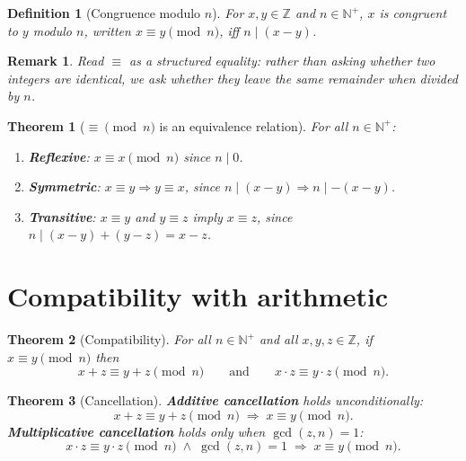 \documentclass[11pt]{article}
\theoremstyle{defstyle}
\newtheorem{definition}{Definition}[section]
\theoremstyle{thmstyle}
\newtheorem{theorem}{Theorem}[section]
\theoremstyle{notstyle}
\newtheorem*{remark}{Remark}
\theoremstyle{cautionstyle}
\newcommand{\Z}{\mathbb{Z}}
\newcommand{\Np}{\mathbb{N}^{+}}
\newcommand{\modn}{\pmod{n}}
\begin{document}
\begin{defbox}
\begin{definition}[Congruence modulo $n$]
For $x, y \in \Z$ and $n \in \Np$, $x$ is \emph{congruent to $y$ modulo
$n$}, written $x \equiv y \modn$, iff $n \mid (x-y)$.
\end{definition}
\end{defbox}

\begin{notebox}
\begin{remark}
Read $\equiv$ as a structured equality: rather than asking whether two
integers are identical, we ask whether they leave the same remainder when
divided by $n$.
\end{remark}
\end{notebox}

\begin{thmbox}
\begin{theorem}[$\equiv \modn$ is an equivalence relation]
For all $n \in \Np$:
\begin{enumerate}[label=\textnormal{(\roman*)}, leftmargin=2em, itemsep=2pt]
  \item \textbf{Reflexive}: $x \equiv x \modn$ since $n \mid 0$.
  \item \textbf{Symmetric}: $x \equiv y \Rightarrow y \equiv x$, since
        $n \mid (x-y) \Rightarrow n \mid -(x-y)$.
  \item \textbf{Transitive}: $x \equiv y$ and $y \equiv z$ imply
        $x \equiv z$, since $n \mid (x-y) + (y-z) = x-z$.
\end{enumerate}
\end{theorem}
\end{thmbox}

\section{Compatibility with arithmetic}

\begin{thmbox}
\begin{theorem}[Compatibility]
For all $n \in \Np$ and all $x, y, z \in \Z$, if $x \equiv y \modn$ then
\[
  x + z \equiv y + z \modn
  \qquad\text{and}\qquad
  x \cdot z \equiv y \cdot z \modn.
\]
\end{theorem}
\end{thmbox}

\begin{thmbox}
\begin{theorem}[Cancellation]
\textbf{Additive cancellation} holds unconditionally:
\[
  x + z \equiv y + z \modn \;\Rightarrow\; x \equiv y \modn.
\]
\textbf{Multiplicative cancellation} holds only when $\gcd(z, n) = 1$:
\[
  x \cdot z \equiv y \cdot z \modn \;\wedge\; \gcd(z,n) = 1
  \;\Rightarrow\; x \equiv y \modn.
\]
\end{theorem}
\end{thmbox}
\end{document}
